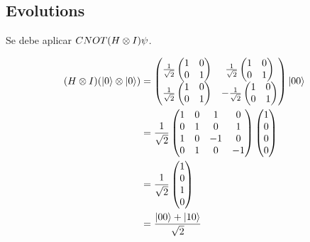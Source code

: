 \documentclass[osajnl,preprint,showpacs,superscriptaddress,10pt]{revtex4-1} %
\DeclarePairedDelimiter\ket{\lvert}{\rangle}
\begin{document}
\subsection{Evolutions}

Se debe aplicar $CNOT (H \tens I) \psi$.

\begin{fleqn}[\parindent]
\begin{equation}
\begin{split}
    (H \tens I) (\ket{0} \tens \ket{0})
        &= \begin{pmatrix}\frac{1}{\sqrt{2}} \begin{pmatrix} 1 & 0 \\ 0 & 1 \end{pmatrix}
            & \frac{1}{\sqrt{2}} \begin{pmatrix} 1 & 0 \\ 0 & 1 \end{pmatrix}
            \\ \frac{1}{\sqrt{2}} \begin{pmatrix} 1 & 0 \\ 0 & 1 \end{pmatrix}
            & -\frac{1}{\sqrt{2}} \begin{pmatrix} 1 & 0 \\ 0 & 1 \end{pmatrix} \end{pmatrix} \ket{00} \\
        &= \frac{1}{\sqrt{2}}
            \begin{pmatrix}
            1 & 0 & 1 & 0 \\
            0 & 1 & 0 & 1 \\
            1 & 0 & -1 & 0 \\
            0 & 1 & 0 & -1
        \end{pmatrix} \begin{pmatrix} 1 \\ 0 \\ 0 \\ 0 \end{pmatrix} \\
        &= \frac{1}{\sqrt{2}} \begin{pmatrix} 1 \\ 0 \\ 1 \\ 0 \end{pmatrix} \\
        &= \frac{\ket{00} + \ket{10}}{\sqrt{2}}
\end{split}
\end{equation}
\end{fleqn}
\end{document}
